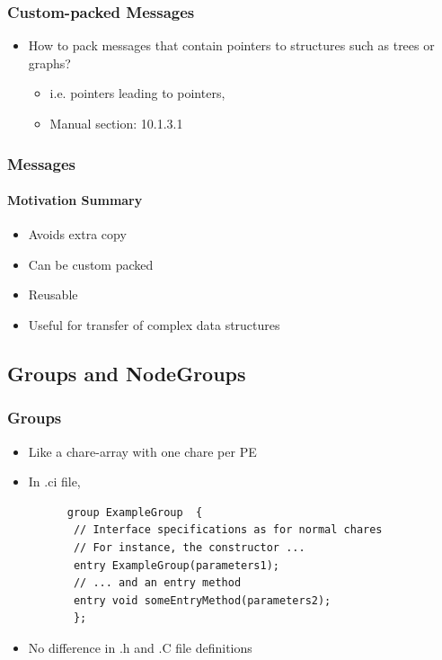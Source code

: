 \begin{frame}[fragile]
  \frametitle{Custom-packed Messages}
  \begin{itemize}
    \item How to pack messages that contain pointers to structures such as trees or graphs?
    \begin{itemize}
       \item i.e. pointers leading to pointers,
       \item Manual section: 10.1.3.1
    \end{itemize}
  \end{itemize}
\end{frame}

\begin{frame}[fragile]
  \frametitle{Messages}
  \framesubtitle{Motivation Summary}
  \begin{itemize}
    \item Avoids extra copy
    \item Can be custom packed
    \item Reusable
    \item Useful for transfer of complex data structures
  \end{itemize}
\end{frame}
\subsection[Groups]{Groups and NodeGroups}
\begin{frame}[fragile]
  \frametitle{Groups}
  \begin{itemize}
    \item Like a chare-array with one chare per PE
    \item In .ci file, 
    \begin{lstlisting}
      group ExampleGroup  {
       // Interface specifications as for normal chares
       // For instance, the constructor ...
       entry ExampleGroup(parameters1);
       // ... and an entry method
       entry void someEntryMethod(parameters2);
       };
    \end{lstlisting}
    \item No difference in .h and .C file definitions
  \end{itemize}
\end{frame}

